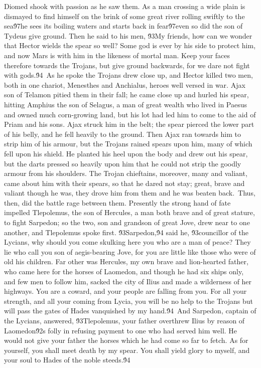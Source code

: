 {Diomed shook with passion as he saw them. As a man crossing a wide plain is dismayed to find himself on the brink of some great river rolling swiftly to the sea\'97he sees its boiling waters and starts back in fear\'97even so did the son of Tydeus give ground. Then he said to his men, \'93My friends, how can we wonder that Hector wields the spear so well? Some god is ever by his side to protect him, and now Mars is with him in the likeness of mortal man. Keep your faces therefore towards the Trojans, but give ground backwards, for we dare not fight with gods.\'94\
As he spoke the Trojans drew close up, and Hector killed two men, both in one chariot, Menesthes and Anchialus, heroes well versed in war. Ajax son of Telamon pitied them in their fall; he came close up and hurled his spear, hitting Amphius the son of Selagus, a man of great wealth who lived in Paesus and owned much corn-growing land, but his lot had led him to come to the aid of Priam and his sons. Ajax struck him in the belt; the spear pierced the lower part of his belly, and he fell heavily to the ground. Then Ajax ran towards him to strip him of his armour, but the Trojans rained spears upon him, many of which fell upon his shield. He planted his heel upon the body and drew out his spear, but the darts pressed so heavily upon him that he could not strip the goodly armour from his shoulders. The Trojan chieftains, moreover, many and valiant, came about him with their spears, so that he dared not stay; great, brave and valiant though he was, they drove him from them and he was beaten back.\
Thus, then, did the battle rage between them. Presently the strong hand of fate impelled Tlepolemus, the son of Hercules, a man both brave and of great stature, to fight Sarpedon; so the two, son and grandson of great Jove, drew near to one another, and Tlepolemus spoke first. \'93Sarpedon,\'94 said he, \'93councillor of the Lycians, why should you come skulking here you who are a man of peace? They lie who call you son of aegis-bearing Jove, for you are little like those who were of old his children. Far other was Hercules, my own brave and lion-hearted father, who came here for the horses of Laomedon, and though he had six ships only, and few men to follow him, sacked the city of Ilius and made a wilderness of her highways. You are a coward, and your people are falling from you. For all your strength, and all your coming from Lycia, you will be no help to the Trojans but will pass the gates of Hades vanquished by my hand.\'94\
And Sarpedon, captain of the Lycians, answered, \'93Tlepolemus, your father overthrew Ilius by reason of Laomedon\'92s folly in refusing payment to one who had served him well. He would not give your father the horses which he had come so far to fetch. As for yourself, you shall meet death by my spear. You shall yield glory to myself, and your soul to Hades of the noble steeds.\'94\
}
